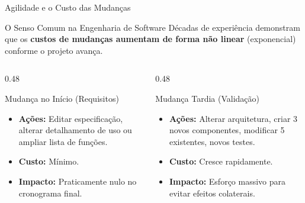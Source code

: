 \documentclass[aspectratio=169, 9pt]{beamer}
\begin{document}
\begin{frame}{Agilidade e o Custo das Mudanças}
  \begin{block}{O Senso Comum na Engenharia de Software}
    Décadas de experiência demonstram que os \textbf{custos de mudanças aumentam de forma não linear} (exponencial) conforme o projeto avança.
  \end{block}

  \vspace{0.2cm}
  \begin{columns}[T]
    \begin{column}{0.48\textwidth}
      \begin{exampleblock}{Mudança no Início (Requisitos)}
        \begin{itemize}
          \item \textbf{Ações:} Editar especificação, alterar detalhamento de uso ou ampliar lista de funções.
          \item \textbf{Custo:} Mínimo.
          \item \textbf{Impacto:} Praticamente nulo no cronograma final.
        \end{itemize}
      \end{exampleblock}
    \end{column}

    \begin{column}{0.48\textwidth}
      \begin{alertblock}{Mudança Tardia (Validação)}
        \begin{itemize}
          \item \textbf{Ações:} Alterar arquitetura, criar 3 novos componentes, modificar 5 existentes, novos testes.
          \item \textbf{Custo:} Cresce rapidamente.
          \item \textbf{Impacto:} Esforço massivo para evitar efeitos colaterais.
        \end{itemize}
      \end{alertblock}
    \end{column}
  \end{columns}
\end{frame}
\end{document}
